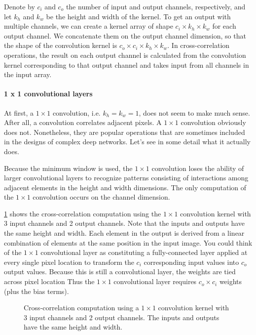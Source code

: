 Denote by $c_i$ and $c_o$  the number of input and output channels, respectively, and let $k_h$ and $k_w$ be the height and width of the kernel. To get an output with multiple channels, we can create a kernel array of shape $c_i \times k_h \times k_w$ for each output channel. We concatenate them on the output channel dimension, so that the shape of the convolution kernel is $c_o \times c_i \times k_h \times k_w$. In cross-correlation operations, the result on each output channel is calculated from the convolution kernel corresponding to that output channel and takes input from all channels in the input array.

\paragraph{1 x 1 convolutional layers}

At first, a $1 \times 1$  convolution, i.e.  $k_h=k_w=1$, does not seem to make much sense. After all, a convolution correlates adjacent pixels. A $1 \times 1$ convolution obviously does not. Nonetheless, they are popular operations that are sometimes included in the designs of complex deep networks. Let’s see in some detail what it actually does.

Because the minimum window is used, the $1 \times 1$ convolution loses the ability of larger convolutional layers to recognize patterns consisting of interactions among adjacent elements in the height and width dimensions. The only computation of the $1 \times 1$ convolution occurs on the channel dimension.

\cref{fig:conv_1x1} shows the cross-correlation computation using the $1 \times 1$ convolution kernel with 3 input channels and 2 output channels. Note that the inputs and outputs have the same height and width. Each element in the output is derived from a linear combination of elements at the same position in the input image. You could think of the $1 \times 1$  convolutional layer as constituting a fully-connected layer applied at every single pixel location to transform the $c_i$ corresponding input values into $c_o$ output values. Because this is still a convolutional layer, the weights are tied across pixel location Thus the $1 \times 1$  convolutional layer requires $c_o \times c_i$ weights (plus the bias terms).

\begin{figure}[hpt]
	\centering
	
	\caption{Cross-correlation computation using a $1 \times 1$ convolution kernel with 3 input channels and 2 output channels. The inputs and outputs have the same height and width.}
	\label{fig:conv_1x1}
\end{figure}

